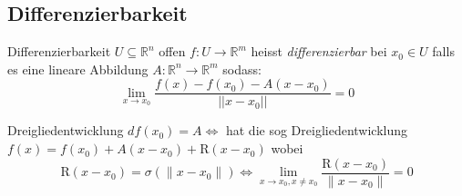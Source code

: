 \documentclass[a4paper,10pt]{article}
\begin{document}
\subsection{Differenzierbarkeit}

\begin{mainbox}{Differenzierbarkeit}
 $U \subseteq \mathbb{R}^{n}$ offen $f:U\to \mathbb{R}^{m}$ heisst \textit{differenzierbar} bei $x_{0}\in U$ falls es eine lineare Abbildung $A:\mathbb{R}^{n}\to \mathbb{R}^{m}$ sodass: $$\lim_{ x \to x_{0} } \frac{f(x)-f(x_{0})-A(x-x_{0})}{|| x-x_{0}||}=0$$
\end{mainbox}
\begin{subbox}{Dreigliedentwicklung}
	$d f (x_{0})=A \iff$ hat die sog Dreigliedentwicklung
  	$f(x)=f(x_{0})+A(x-x_{0})+\text{R}(x-x_{0})$ wobei 
  	$$\text{R}(x-x_{0})=\sigma(\| x-x_{0} \|) \iff \lim_{ x \to x_{0}, x\neq x_{0} } \frac{\text{R}(x-x_{0})}{\| x-x_{0} \|}=0$$
\end{subbox}
\end{document}
